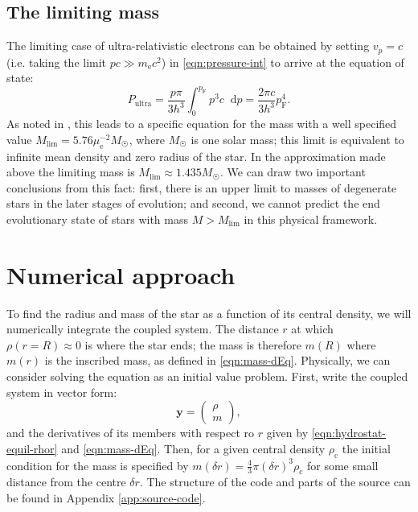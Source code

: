 \documentclass[]{article}
\newcommand{\dd}{\mathop{}\!\mathrm{d}}
\renewcommand{\vec}[1]{\boldsymbol{#1}}
\newcommand{\rhoCentre}{\rho_\mathrm{c}}
\newcommand{\fermiMtm}{p_\mathrm{F}}
\newcommand{\massElectron}{m_\mathrm{e}}
\begin{document}
\subsection{The limiting mass}
	The limiting case of ultra-relativistic electrons can be obtained by setting $v_p = c$ (i.e. taking the limit $pc \gg \massElectron c^2$) in \eqref{eqn:pressure-int} to arrive at the equation of state:
	\begin{equation}
		P_\mathrm{ultra} = \frac{p \pi}{3 h^3} \int_0^{\fermiMtm} p^3 c \dd p = \frac{2 \pi c}{3 h^3} \fermiMtm^4.
	\end{equation}
	As noted in \cite{Chandrasekhar1984}, this leads to a specific equation for the mass with a well specified value $M_\mathrm{lim} = 5.76 \mu_{\mathrm{e}}^{-2} M_{\astrosun}$, where $M_{\astrosun}$ is one solar mass; this limit is equivalent to infinite mean density and zero radius of the star. In the approximation made above the limiting mass is $M_\mathrm{lim} \approx 1.435 M_{\astrosun}$. We can draw two important conclusions from this fact: first, there is an upper limit to masses of degenerate stars in the later stages of evolution; and second, we cannot predict the end evolutionary state of stars with mass $ M > M_\mathrm{lim}$ in this physical framework.

\section{Numerical approach}\label{sec:numerical-approach}
	To find the radius and mass of the star as a function of its central density, we will numerically integrate the coupled system. The distance $r$ at which $\rho (r=R) \approx 0$ is where the star ends; the mass is therefore $m(R)$ where $m(r)$ is the inscribed mass, as defined in \eqref{eqn:mass-dEq}. Physically, we can consider solving the equation as an initial value problem. First, write the coupled system in vector form:
	\begin{equation}
		\vec{y} = \begin{pmatrix}
			\rho \\
			m
		\end{pmatrix},
	\end{equation}
	and the derivatives of its members with respect ro $r$ given by \eqref{eqn:hydrostat-equil-rhor} and \eqref{eqn:mass-dEq}. Then, for a given central density $\rhoCentre$ the initial condition for the mass is specified by $m(\delta r) = \frac{4}{3} \pi (\delta r)^3 \rhoCentre$ for some small distance from the centre $\delta r$. The structure of the code and parts of the source can be found in Appendix \ref{app:source-code}.
\end{document}
